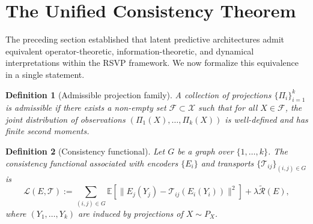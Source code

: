 \documentclass[12pt, oneside]{article}
\newtheorem{definition}{Definition}[section]
\begin{document}
\section{The Unified Consistency Theorem}
\label{sec:unified-theorem}

The preceding section established that latent predictive architectures admit equivalent operator-theoretic, information-theoretic, and dynamical interpretations within the RSVP framework. We now formalize this equivalence in a single statement.

\begin{definition}[Admissible projection family]
A collection of projections $\{\Pi_i\}_{i=1}^k$ is admissible if there exists a non-empty set $\mathcal{F} \subset \mathcal{X}$ such that for all $X \in \mathcal{F}$, the joint distribution of observations $(\Pi_1(X), \dots, \Pi_k(X))$ is well-defined and has finite second moments.
\end{definition}

\begin{definition}[Consistency functional]
Let $G$ be a graph over $\{1,\dots,k\}$. The consistency functional associated with encoders $\{E_i\}$ and transports $\{\mathcal{T}_{ij}\}_{(i,j)\in G}$ is
\[
\mathcal{L}(E, \mathcal{T}) :=
\sum_{(i,j)\in G}
\mathbb{E}\left[
\|E_j(Y_j) - \mathcal{T}_{ij}(E_i(Y_i))\|^2
\right]
+ \lambda \widetilde{\mathcal{R}}(E),
\]
where $(Y_1,\dots,Y_k)$ are induced by projections of $X \sim P_X$.
\end{definition}
\end{document}
